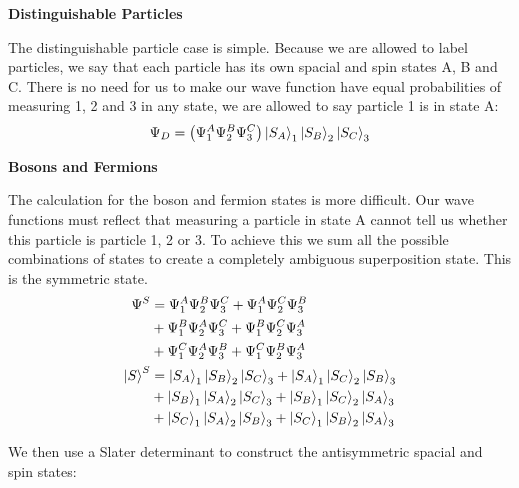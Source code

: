 \documentclass[10pt]{article} %
\begin{document}
\textbf{Distinguishable Particles}

The distinguishable particle case is simple. Because we are allowed to label particles, we say that
each particle has its own spacial and spin states A, B and C. There is no need for us to make our
wave function have equal probabilities of measuring 1, 2 and 3 in any state, we are allowed to say
particle 1 is in state A:\\

\begin{align*}
  \Psi_D &= \left(\Psi_1^A\Psi_2^B\Psi_3^C\right)\ket{S_A}_1\ket{S_B}_2\ket{S_C}_3\\
\end{align*}

\textbf{Bosons and Fermions}

The calculation for the boson and fermion states is more difficult. Our wave functions must reflect
that measuring a particle in state A cannot tell us whether this particle is particle 1, 2 or 3. To
achieve this we sum all the possible combinations of states to create a completely ambiguous
superposition state. This is the symmetric state.\\

\begin{align*}
  \Psi^{S} &=
  \Psi_1^A\Psi_2^B\Psi_3^C + \Psi_1^A\Psi_2^C\Psi_3^B\\
  &+ \Psi_1^B\Psi_2^A\Psi_3^C + \Psi_1^B\Psi_2^C\Psi_3^A\\
  &+ \Psi_1^C\Psi_2^A\Psi_3^B + \Psi_1^C\Psi_2^B\Psi_3^A\\
  \ket{S}^{S} &=
  \ket{S_A}_1\ket{S_B}_2\ket{S_C}_3 + \ket{S_A}_1\ket{S_C}_2\ket{S_B}_3\\
  &+ \ket{S_B}_1\ket{S_A}_2\ket{S_C}_3 + \ket{S_B}_1\ket{S_C}_2\ket{S_A}_3\\
  &+ \ket{S_C}_1\ket{S_A}_2\ket{S_B}_3 + \ket{S_C}_1\ket{S_B}_2\ket{S_A}_3\\
\end{align*}

We then use a Slater determinant to construct the antisymmetric spacial and spin states:\\
\end{document}
